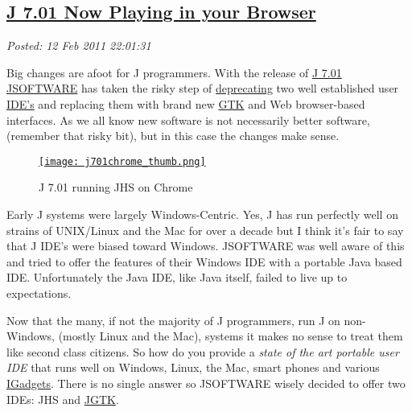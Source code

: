 %

\subsection*{\href{http://bakerjd99.wordpress.com/2011/02/12/j-7-01-now-playing-in-your-browser/}{J 7.01 Now Playing in your Browser}}


\noindent\emph{Posted: 12 Feb 2011 22:01:31}
\vspace{6pt}

Big changes are afoot for J programmers. With the release of
\href{http://www.jsoftware.com/docs/help701/user/relhigh.htm}{J 7.01}
\href{http://www.jsoftware.com/}{JSOFTWARE} has taken the risky step of
\href{http://en.wikipedia.org/wiki/Deprecation}{deprecating} two well
established user
\href{http://en.wikipedia.org/wiki/Integrated\_development\_environment}{IDE's}
and replacing them with brand new \href{http://www.gtk.org/}{GTK} and
Web browser-based interfaces. As we all know new software is not
necessarily better software, (remember that risky bit), but in this case
the changes make sense.


\captionsetup[figure]{labelformat=empty}
\begin{figure}[htbp]
\centering
\href{http://www.jsoftware.com/}{\texttt{[image: j701chrome\_thumb.png]}}
\caption{J 7.01  running JHS on  Chrome}
\label{fig:1070X0}
\end{figure}


Early J systems were largely Windows-Centric. Yes, J has run perfectly
well on strains of UNIX/Linux and the Mac for over a decade but I think
it's fair to say that J IDE's were biased toward Windows. JSOFTWARE was
well aware of this and tried to offer the features of their Windows IDE
with a portable Java based IDE. Unfortunately the Java IDE, like Java
itself, failed to live up to expectations.

Now that the many, if not the majority of J programmers, run J on
non-Windows, (mostly Linux and the Mac), systems it makes no sense to
treat them like second class citizens. So how do you provide a
\emph{state of the art portable user IDE} that runs well on Windows,
Linux, the Mac, smart phones and various
\href{http://pinoytutorial.com/techtorial/iboard-and-imat-future-of-apple-products/}{IGadgets}.
There is no single answer so JSOFTWARE wisely decided to offer two IDEs:
JHS and
\href{http://www.jsoftware.com/jwiki/System/Installation/J701/Gtk}{JGTK}.

